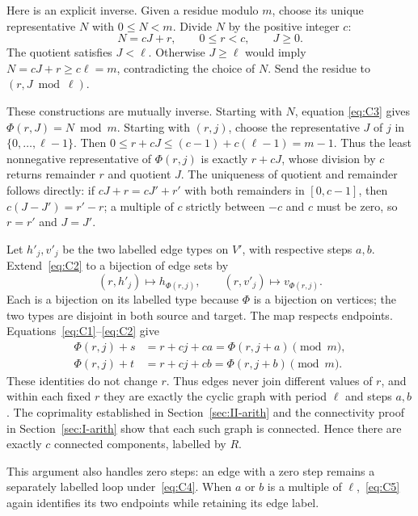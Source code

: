 \documentclass{article}
\numberwithin{equation}{section}
\begin{document}
Here is an explicit inverse. Given a residue modulo \(m\), choose its unique
representative \(N\) with \(0\le N<m\). Divide \(N\) by the positive integer \(c\):
\begin{equation}\label{eq:C3}
  N=cJ+r,\qquad 0\le r<c,\qquad J\ge0.
\end{equation}
The quotient satisfies \(J<\ell\). Otherwise \(J\ge\ell\) would imply
\(N=cJ+r\ge c\ell=m\), contradicting the choice of \(N\). Send the residue
to \((r,J\bmod\ell)\).

These constructions are mutually inverse. Starting with \(N\), equation
\eqref{eq:C3} gives \(\Phi(r,J)=N\bmod m\). Starting with \((r,j)\), choose the
representative \(J\) of \(j\) in \(\{0,\ldots,\ell-1\}\). Then
\(0\le r+cJ\le(c-1)+c(\ell-1)=m-1\). Thus the least nonnegative
representative of \(\Phi(r,j)\) is exactly \(r+cJ\), whose division by \(c\)
returns remainder \(r\) and quotient \(J\). The uniqueness of quotient and
remainder follows directly: if \(cJ+r=cJ'+r'\) with both remainders in
\([0,c-1]\), then \(c(J-J')=r'-r\); a multiple of \(c\) strictly between
\(-c\) and \(c\) must be zero, so \(r=r'\) and \(J=J'\).

Let \(h'_j,v'_j\) be the two labelled edge types on \(V'\), with respective
steps \(a,b\). Extend~\eqref{eq:C2} to a bijection of edge sets by
\begin{equation}\label{eq:C4}
  (r,h'_j)\longmapsto h_{\Phi(r,j)},\qquad
  (r,v'_j)\longmapsto v_{\Phi(r,j)}.
\end{equation}
Each is a bijection on its labelled type because \(\Phi\) is a bijection
on vertices; the two types are disjoint in both source and target.
The map respects endpoints. Equations~\eqref{eq:C1}--\eqref{eq:C2} give
\begin{equation}\label{eq:C5}
  \begin{aligned}
    \Phi(r,j)+s&=r+cj+ca=\Phi(r,j+a)\pmod m,\\
    \Phi(r,j)+t&=r+cj+cb=\Phi(r,j+b)\pmod m.
  \end{aligned}
\end{equation}
These identities do not change \(r\). Thus edges never join different
values of \(r\), and within each fixed \(r\) they are exactly the cyclic
graph with period \(\ell\) and steps \(a,b\). The coprimality established
in Section~\ref{sec:II-arith} and the connectivity proof in Section~\ref{sec:I-arith}
show that each such graph is connected. Hence there are
exactly \(c\) connected components, labelled by \(R\).

This argument also handles zero steps: an edge with a zero step remains
a separately labelled loop under~\eqref{eq:C4}. When \(a\) or \(b\) is a multiple
of \(\ell\),~\eqref{eq:C5} again identifies its two endpoints while retaining its
edge label.
\end{document}
